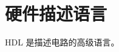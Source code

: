 \documentclass[cn,11pt,chinese,black,simple]{../elegantbook}
\begin{document}
\fi 
\def\chapname{02veriloghdl}

\chapter{硬件描述语言}

HDL 是描述电路的高级语言。

\let\chapname\undefined
\ifx\mainclass\undefined
\end{document}
